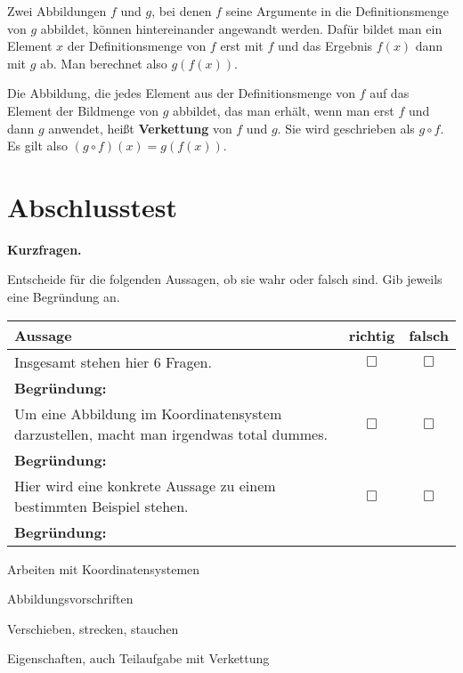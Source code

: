 \documentclass[solution]{uebungsblatt}
\begin{document}
\begin{remark}
\parpic[r]{}
Zwei Abbildungen $f$ und $g$, bei denen $f$ seine Argumente in die Definitionsmenge von $g$ abbildet, können hintereinander angewandt werden. Dafür bildet man ein Element $x$ der Definitionsmenge von $f$ erst mit $f$ und das Ergebnis $f(x)$ dann mit $g$ ab. Man berechnet also $g(f(x))$.

Die Abbildung, die jedes Element aus der Definitionsmenge von $f$ auf das Element der Bildmenge von $g$ abbildet, das man erhält, wenn man erst $f$ und dann $g$ anwendet, heißt \textbf{Verkettung} von $f$ und $g$. Sie wird geschrieben als $g\circ f$. Es gilt also $(g\circ f)(x)=g(f(x))$.
\end{remark}

\newpage

\section*{Abschlusstest}

\vspace*{5mm}

\begin{exercise}
    \textbf{Kurzfragen.} 
    
    Entscheide für die folgenden Aussagen, ob sie wahr oder falsch sind. Gib jeweils eine Begründung an.
    
    \begin{center}
        \begin{tabular}{p{}cc}
            \toprule
            Aussage & richtig & falsch\\\midrule
            Insgesamt stehen hier 6 Fragen. & $\Box$ & $\Box$ \\
            \multicolumn{3}{l}{\textbf{Begründung:}}\\\midrule
            Um eine Abbildung im Koordinatensystem darzustellen, macht man irgendwas total dummes. & $\Box$ & $\Box$ \\
            \multicolumn{3}{l}{\textbf{Begründung:}}\\\midrule
            Hier wird eine konkrete Aussage zu einem bestimmten Beispiel stehen. & $\Box$ & $\Box$ \\
            \multicolumn{3}{l}{\textbf{Begründung:}}\\\midrule
            \bottomrule
        \end{tabular}
    \end{center}
\end{exercise}

\begin{exercise}
    Arbeiten mit Koordinatensystemen
\end{exercise}

\begin{exercise}
    Abbildungsvorschriften
\end{exercise}

\begin{exercise}
    Verschieben, strecken, stauchen
\end{exercise}

\begin{exercise}
    Eigenschaften, auch Teilaufgabe mit Verkettung
\end{exercise}
\end{document}
